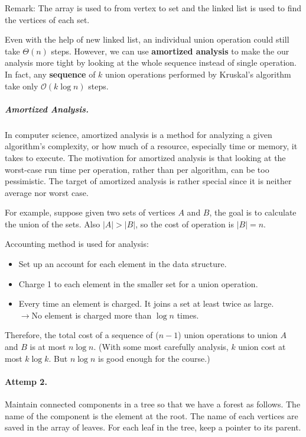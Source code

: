 Remark: The array is used to from vertex to set and the linked list is used to find the vertices of each set.

Even with the help of new linked list, an individual union operation could still take $\Theta(n)$ steps. However, we can use \textbf{amortized analysis} to make the our analysis more tight by looking at the whole sequence instead of single operation. In fact, any \textbf{sequence} of $k$ union operations performed by Kruskal's algorithm take only $\mathcal{O}(k\log n)$ steps.

\subparagraph{Amortized Analysis.} In computer science, amortized analysis is a method for analyzing a given algorithm's complexity, or how much of a resource, especially time or memory, it takes to execute. The motivation for amortized analysis is that looking at the worst-case run time per operation, rather than per algorithm, can be too pessimistic. The target of amortized analysis is rather special since it is neither average nor worst case.

For example, suppose given two sets of vertices $A$ and $B$, the goal is to calculate the union of the sets. Also $|A| > |B|$, so the cost of operation is $|B| = n$.
 
Accounting method is used for analysis:
\begin{itemize}
	\item Set up an account for each element in the data structure. 
	\item Charge 1 to each element in the smaller set for a union operation. 
	\item Every time an element is charged. It joins a set at least twice as large. \\ $\rightarrow$No element is charged more than $\log n$ times.
\end{itemize}

Therefore, the total cost of a sequence of ($n-1$) union operations to union $A$ and $B$ is at most $n \log n$. (With some most carefully analysis, $k$ union cost at most $k\log k$. But $n\log n $ is good enough for the course.)

\paragraph{Attemp 2.} Maintain connected components in a tree so that we have a forest as follows. The name of the component is the element at the root. The name of each vertices are saved in the array of leaves. For each leaf in the tree, keep a pointer to its parent. 

